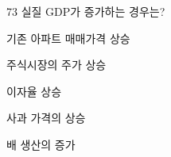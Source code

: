\begin{question}{73}
실질 GDP가 증가하는 경우는?
\begin{choices}
  \item 기존 아파트 매매가격 상승
  \item 주식시장의 주가 상승
  \item 이자율 상승
  \item 사과 가격의 상승
  \item 배 생산의 증가
\end{choices}
\end{question}
